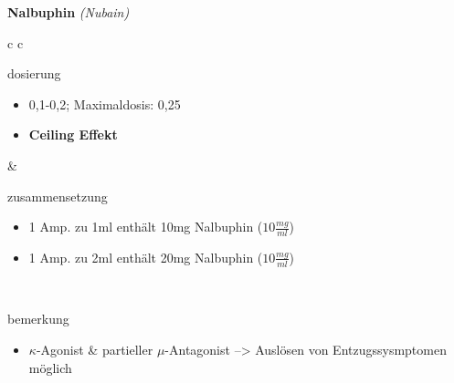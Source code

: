 \begin{frame}{
    \textbf{Nalbuphin}
    \textit{(Nubain)}
}
    \begin{tabular}{c c}
        \begin{beamercolorbox}[wd=\boxwidth\textwidth,ht=\boxheight\textheight,sep=1em]{dosierung}
            \begin{itemize}
                \item 0,1-0,2\mgkgkg; Maximaldosis: 0,25\mgkg
                \item \textbf{Ceiling Effekt}
            \end{itemize}
        \end{beamercolorbox} & 
        \begin{beamercolorbox}[wd=\boxwidth\textwidth,ht=\boxheight\textheight,sep=1em]{zusammensetzung}
            \begin{itemize}
                \item 1 Amp. zu 1ml enthält 10mg Nalbuphin ($10\frac{mg}{ml}$)
                \item 1 Amp. zu 2ml enthält 20mg Nalbuphin ($10\frac{mg}{ml}$)
            \end{itemize}
        \end{beamercolorbox} \\
        \begin{beamercolorbox}[wd=\textwidth,ht=\boxheight\textheight,sep=1em]{bemerkung}
            \begin{itemize}
                \item $\kappa$-Agonist \& partieller $\mu$-Antagonist --> Auslösen von Entzugssysmptomen möglich
            \end{itemize}
        \end{beamercolorbox} \\
    \end{tabular}
\end{frame}

